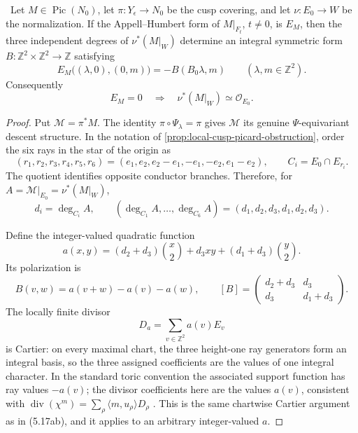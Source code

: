\begin{lemma}
\label{lem:analytic-support-specialization}
\Verified\ Let \(M\in\operatorname{Pic}(N_0)\), let
\(\pi:Y_\epsilon\to N_0\) be the cusp covering, and let
\(\nu:E_0\to W\) be the normalization.  If the Appell--Humbert form of
\(M|_{F_t}\), \(t\ne0\), is \(E_M\), then the three independent degrees
of \(\nu^*(M|_W)\) determine an integral symmetric form
\(B:\mathbb Z^2\times\mathbb Z^2\to\mathbb Z\) satisfying
\[
 E_M\bigl((\lambda,0),(0,m)\bigr)
 =-B(B_0\lambda,m)
 \qquad(\lambda,m\in\mathbb Z^2).
\tag{5.17-A21}
\]
Consequently
\[
 E_M=0
 \quad\Longrightarrow\quad
 \nu^*(M|_W)\simeq\mathcal O_{E_0}.
\tag{5.17-A22}
\]
\end{lemma}

\begin{proof}
Put \(\mathcal M=\pi^*M\).  The identity
\(\pi\circ\Psi_\lambda=\pi\) gives \(\mathcal M\) its genuine
\(\Psi\)-equivariant descent structure.  In the notation of
\cref{prop:local-cusp-picard-obstruction}, order the six rays in the star
of the origin as
\[
 (r_1,r_2,r_3,r_4,r_5,r_6)
 =(e_1,e_2,e_2-e_1,-e_1,-e_2,e_1-e_2),
 \qquad C_i=E_0\cap E_{r_i}.
\tag{5.17-A23}
\]
The quotient identifies opposite conductor branches.  Therefore, for
\(A=\mathcal M|_{E_0}=\nu^*(M|_W)\),
\[
 d_i=\deg_{C_i}A,
 \qquad
 (\deg_{C_1}A,\ldots,\deg_{C_6}A)
 =(d_1,d_2,d_3,d_1,d_2,d_3).
\tag{5.17-A24}
\]

Define the integer-valued quadratic function
\[
 a(x,y)
 =(d_2+d_3)\binom{x}{2}+d_3xy+(d_1+d_3)\binom{y}{2}.
\tag{5.17-A25}
\]
Its polarization is
\[
 B(v,w)=a(v+w)-a(v)-a(w),
 \qquad
 [B]=
 \begin{pmatrix}
  d_2+d_3&d_3\\ d_3&d_1+d_3
 \end{pmatrix}.
\tag{5.17-A26}
\]
The locally finite divisor
\[
 D_a=\sum_{v\in\mathbb Z^2}a(v)E_v
\tag{5.17-A27}
\]
is Cartier: on every maximal chart, the three height-one ray generators
form an integral basis, so the three assigned coefficients are the values
of one integral character.  In the standard toric convention the associated
support function has ray values \(-a(v)\); the divisor coefficients here are
the values \(a(v)\), consistent with
\(\operatorname{div}(\chi^m)=\sum_\rho\langle m,u_\rho\rangle D_\rho\)
\cite[\S3.3, pp.~60--63; \S3.4, pp.~63--72]{Fulton1993}%
\cite[Propositions~4.1.1--4.1.2, p.~171; Theorems~4.2.8,
p.~179 and~4.2.12, p.~182]{CoxLittleSchenck2011}.
This is the same chartwise Cartier argument as
in (5.17ab), and it applies to an arbitrary integer-valued \(a\).


\end{proof}
